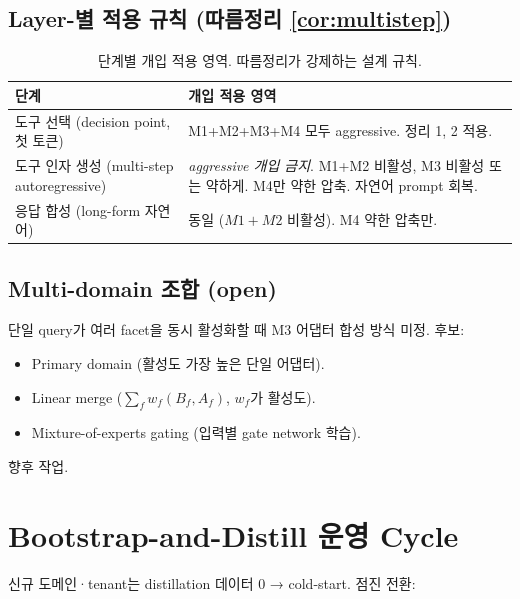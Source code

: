 \documentclass[11pt]{article}
\theoremstyle{definition}
\begin{document}
\subsection{Layer-별 적용 규칙 (따름정리 \ref{cor:multistep})}
\label{sec:layer-rules}

\begin{table}[h]
\centering
\caption{단계별 개입 적용 영역. 따름정리가 강제하는 설계 규칙.}
\label{tab:layer-rules}
\small
\begin{tabular}{lp{}}
\toprule
단계 & 개입 적용 영역 \\
\midrule
도구 선택 (decision point, 첫 토큰) & M1+M2+M3+M4 모두 aggressive. 정리 1, 2 적용. \\
도구 인자 생성 (multi-step autoregressive) & \emph{aggressive 개입 금지}. M1+M2 비활성, M3 비활성 또는 약하게. M4만 약한 압축. 자연어 prompt 회복. \\
응답 합성 (long-form 자연어) & 동일 ($M1+M2$ 비활성). M4 약한 압축만. \\
\bottomrule
\end{tabular}
\end{table}

\subsection{Multi-domain 조합 (open)}

단일 query가 여러 facet을 동시 활성화할 때 M3 어댑터 합성 방식 미정. 후보:
\begin{itemize}[leftmargin=*]
\item Primary domain (활성도 가장 높은 단일 어댑터).
\item Linear merge ($\sum_f w_f (B_f, A_f)$, $w_f$가 활성도).
\item Mixture-of-experts gating (입력별 gate network 학습).
\end{itemize}
향후 작업.

\section{Bootstrap-and-Distill 운영 Cycle}
\label{sec:operation}

신규 도메인·tenant는 distillation 데이터 0 → cold-start. 점진 전환:
\end{document}
